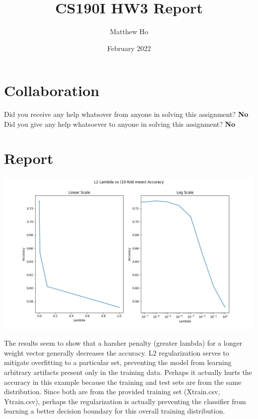 \documentclass{article}
\title{CS190I HW3 Report}
\author{Matthew Ho}
\date{February 2022}
\begin{document}
\maketitle

\section{Collaboration}
Did you receive any help whatsover from anyone in solving this assignment? \textbf{No}\\
Did you give any help whatsoever to anyone in solving this assignment? \textbf{No}

\section{Report}
\begin{center}
\includegraphics[scale=0.5]{lambda_graph}
\end{center}

The results seem to show that a harsher penalty (greater lambda) for a longer weight vector generally decreases the accuracy. L2 regularization serves to mitigate overfitting to a particular set, preventing the model from learning arbitrary artifacts present only in the training data. Perhaps it actually hurts the accuracy in this example because the training and test sets are from the same distribution. Since both are from the provided training set (Xtrain.csv, Ytrain.csv), perhaps the regularization is actually preventing the classifier from learning a better decision boundary for this overall training distribution.
\end{document}
